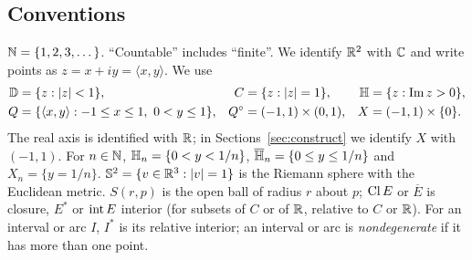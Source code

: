 \subsection{Conventions}\label{sec:conventions}
$\mathbb{N}=\{1,2,3,\dots\}$. ``Countable'' includes ``finite''. We identify $\mathbb{R}^2$ with $\mathbb{C}$ and write points as
$z=x+iy=\langle x,y\rangle$. We use
\begin{align*}
\mathbb{D}&=\{z:\lvert z\rvert<1\}, & C&=\{z:\lvert z\rvert=1\}, & \mathbb{H}&=\{z:\operatorname{Im}z>0\},\\
Q&=\{\langle x,y\rangle:-1\le x\le1,\ 0<y\le1\}, & Q^\circ&=(-1,1)\times(0,1), &
X&=(-1,1)\times\{0\}.
\end{align*}
The real axis is identified with $\mathbb{R}$; in Sections~\ref{sec:construct} we identify $X$ with $(-1,1)$.
For $n\in\mathbb{N}$, $\mathbb{H}_n=\{0<y<1/n\}$, $\overline{\mathbb{H}}_n=\{0\le y\le 1/n\}$ and $X_n=\{y=1/n\}$.
$\mathbb{S}^2=\{v\in\mathbb{R}^3:\lvert v\rvert=1\}$ is the Riemann sphere with the Euclidean metric.
$S(r,p)$ is the open ball of radius $r$ about $p$; $\operatorname{Cl} E$ or $\overline E$ is closure, $E^*$ or
$\operatorname{int} E$ interior (for subsets of $C$ or of $\mathbb{R}$, relative to $C$ or $\mathbb{R}$).
For an interval or arc $I$, $I^*$ is its relative interior; an interval or arc is
\emph{nondegenerate} if it has more than one point.
